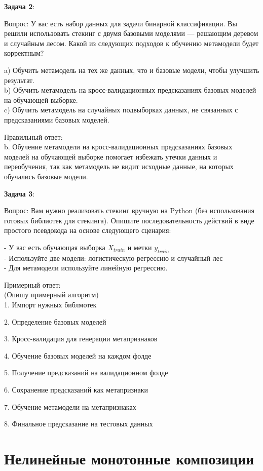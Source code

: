 \textbf{Задача 2}:

Вопрос: У вас есть набор данных для задачи бинарной классификации. Вы решили использовать стекинг с двумя базовыми моделями — решающим деревом и случайным лесом. Какой из следующих подходов к обучению метамодели будет корректным?

a) Обучить метамодель на тех же данных, что и базовые модели, чтобы улучшить результат.  \\
b) Обучить метамодель на кросс-валидационных предсказаниях базовых моделей на обучающей выборке.  \\
c) Обучить метамодель на случайных подвыборках данных, не связанных с предсказаниями базовых моделей.

Правильный ответ:  \\
b. Обучение метамодели на кросс-валидационных предсказаниях базовых моделей на обучающей выборке помогает избежать утечки данных и переобучения, так как метамодель не видит исходные данные, на которых обучались базовые модели.


\textbf{Задача 3}:

Вопрос: Вам нужно реализовать стекинг вручную на Python (без использования готовых библиотек для стекинга). Опишите последовательность действий в виде простого псевдокода на основе следующего сценария:

- У вас есть обучающая выборка $X_{train}$ и метки $y_{train}$ \\
- Используйте две модели: логистическую регрессию и случайный лес \\
- Для метамодели используйте линейную регрессию.

Примерный ответ:\\
(Опишу примерный алгоритм)\\
1. Импорт нужных библмотек

2. Определение базовых моделей

3. Кросс-валидация для генерации метапризнаков

4. Обучение базовых моделей на каждом фолде

5. Получение предсказаний на валидационном фолде

6. Сохранение предсказаний как метапризнаки

7. Обучение метамодели на метапризнаках

8. Финальное предсказание на тестовых данных


\section{Нелинейные монотонные композиции}
